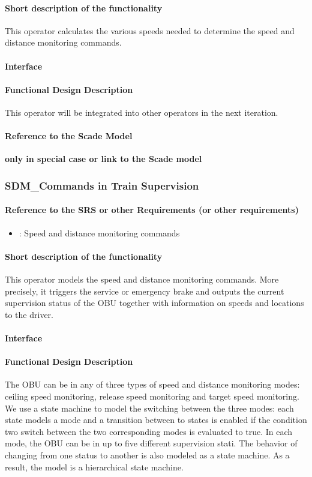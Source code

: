 \paragraph{Short description of the functionality}
This operator calculates the various speeds needed to determine the speed and distance monitoring commands.
\paragraph{Interface}
\paragraph{Functional Design Description}
This operator will be integrated into other operators in the next iteration.
\paragraph{Reference to the Scade Model}
\textbf{only in special case or link to the Scade model}

\subsubsection{SDM\_Commands in Train Supervision}
\paragraph{Reference to the SRS or other Requirements (or other requirements)}
\begin{itemize}
	\item \cite[Chapt.~3.13.10]{subset-026}: Speed and distance monitoring commands 
\end{itemize}
\paragraph{Short description of the functionality}
This operator models the speed and distance monitoring commands. More precisely, it triggers the service or emergency brake and outputs the current supervision status of the OBU together with information on speeds and locations to the driver.
\paragraph{Interface}
\paragraph{Functional Design Description}
The OBU can be in any of three types of speed and distance monitoring modes: ceiling speed monitoring, release speed monitoring and target speed monitoring. We use a state machine to model the switching between the three modes: each state models a mode and a transition between to states is enabled if the condition two switch between the two corresponding modes is evaluated to true. In each mode, the OBU can be in up to five different supervision stati. The behavior of changing from one status to another is also modeled as a state machine. As a result, the model is a hierarchical state machine.
